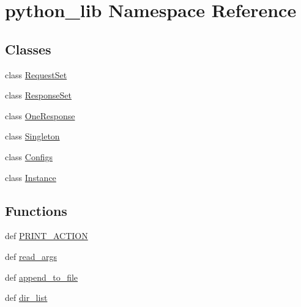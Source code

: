 \hypertarget{namespacepython__lib}{\section{python\-\_\-lib Namespace Reference}
\label{namespacepython__lib}
}
\subsection*{Classes}
\begin{DoxyCompactItemize}
\item 
class \hyperlink{classpython__lib_1_1_request_set}{Request\-Set}
\item 
class \hyperlink{classpython__lib_1_1_response_set}{Response\-Set}
\item 
class \hyperlink{classpython__lib_1_1_one_response}{One\-Response}
\item 
class \hyperlink{classpython__lib_1_1_singleton}{Singleton}
\item 
class \hyperlink{classpython__lib_1_1_configs}{Configs}
\item 
class \hyperlink{classpython__lib_1_1_instance}{Instance}
\end{DoxyCompactItemize}
\subsection*{Functions}
\begin{DoxyCompactItemize}
\item 
def \hyperlink{namespacepython__lib_a7773c2422730b63639dd7dca2ab1c496}{P\-R\-I\-N\-T\-\_\-\-A\-C\-T\-I\-O\-N}
\item 
def \hyperlink{namespacepython__lib_a097b0a877da08c723a02d07c0cb4cb57}{read\-\_\-args}
\item 
def \hyperlink{namespacepython__lib_adacb0c96f7321a6b040892a22e4cbdc9}{append\-\_\-to\-\_\-file}
\item 
def \hyperlink{namespacepython__lib_a32a11ff8ffaca42c9527412287edf0d5}{dir\-\_\-list}
\end{DoxyCompactItemize}


